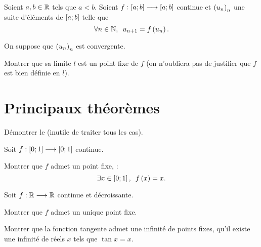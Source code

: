 \begin{corr}
\end{corr}

\begin{exo}
Soient \(a,b\in\mathbb{R}\) tels que \(a<b\). Soient \(f:\left[a;b\right]\longrightarrow\left[a;b\right]\) continue et \(\left(u_n\right)_n\) une suite d'éléments de \(\left[a;b\right]\) telle que \[\quantifs{\forall n\in\N}u_{n+1}=f\paren{u_n}.\]

On suppose que \(\left(u_n\right)_n\) est convergente.

Montrer que sa limite \(l\) est un point fixe de \(f\) (on n'oubliera pas de justifier que \(f\) est bien définie en \(l\)).
\end{exo}

\begin{corr}
\end{corr}

\section{Principaux théorèmes}

\begin{exo}
Démontrer le  (inutile de traiter tous les cas).
\end{exo}

\begin{corr}
\end{corr}

\begin{exo}
Soit \(f:\left[0;1\right]\longrightarrow\left[0;1\right]\) continue.

Montrer que \(f\) admet un point fixe, \cad : \[\quantifs{\exists x\in\intervii{0}{1}}f\paren{x}=x.\]
\end{exo}

\begin{corr}
\end{corr}

\begin{exo}
Soit \(f:\mathbb{R}\longrightarrow\mathbb{R}\) continue et décroissante.

Montrer que \(f\) admet un unique point fixe.
\end{exo}

\begin{corr}
\end{corr}

\begin{exo}
Montrer que la fonction tangente admet une infinité de points fixes, \cad qu'il existe une infinité de réels \(x\) tels que \(\tan x=x\).
\end{exo}

